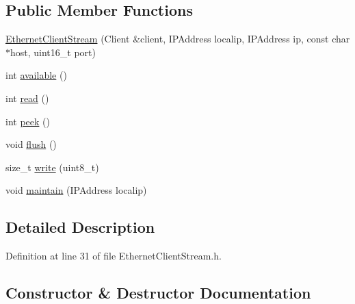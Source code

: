 \subsection*{Public Member Functions}
\begin{DoxyCompactItemize}
\item 
\hyperlink{class_ethernet_client_stream_ad0fc03caf9c77123d2557404b4e13904}{Ethernet\+Client\+Stream} (Client \&client, I\+P\+Address localip, I\+P\+Address ip, const char $\ast$host, uint16\+\_\+t port)
\item 
int \hyperlink{class_ethernet_client_stream_af791449a05185d079c66a3ce7ceb8867}{available} ()
\item 
int \hyperlink{class_ethernet_client_stream_ab09d7fee2e6e57a4ae63227226991673}{read} ()
\item 
int \hyperlink{class_ethernet_client_stream_ab48794c4ecdcf568ca915c54849e33d3}{peek} ()
\item 
void \hyperlink{class_ethernet_client_stream_a6bfd307971b4f6936cbb00eb04276e7f}{flush} ()
\item 
size\+\_\+t \hyperlink{class_ethernet_client_stream_aca0236433d48beb3ada438dbdb425bbd}{write} (uint8\+\_\+t)
\item 
void \hyperlink{class_ethernet_client_stream_a2cb7fc9f588d352ad57527e7189196ea}{maintain} (I\+P\+Address localip)
\end{DoxyCompactItemize}


\subsection{Detailed Description}


Definition at line 31 of file Ethernet\+Client\+Stream.\+h.



\subsection{Constructor \& Destructor Documentation}

